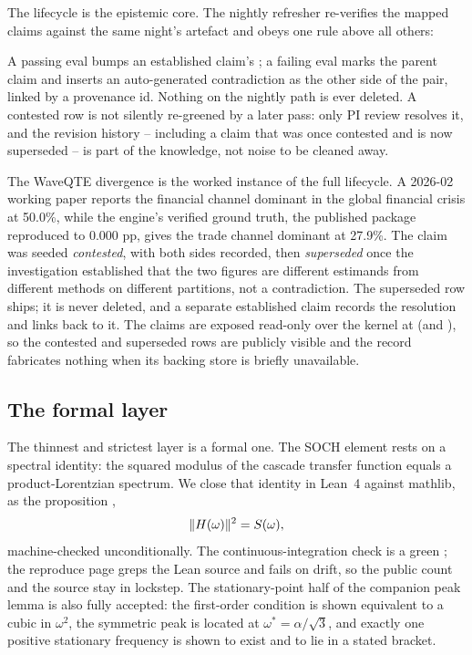 The lifecycle is the epistemic core. The nightly refresher
 re-verifies the mapped claims against the same
night's artefact and obeys one rule above all others:

\begin{invariant}
\label{inv:nodelete}
A passing eval bumps an established claim's ; a failing eval
marks the parent claim  and inserts an auto-generated
contradiction as the other side of the pair, linked by a  provenance
id. Nothing on the nightly path is ever deleted. A contested row is not silently
re-greened by a later pass: only PI review resolves it, and the revision history
-- including a claim that was once contested and is now superseded -- is part of
the knowledge, not noise to be cleaned away.
\end{invariant}

\noindent The WaveQTE divergence is the worked instance of the full lifecycle. A
2026-02 working paper reports the financial channel dominant in the global
financial crisis at 50.0\%, while the engine's verified ground truth, the
published package reproduced to 0.000 pp, gives the trade channel dominant at
27.9\%. The claim was seeded \emph{contested}, with both sides recorded, then
\emph{superseded} once the investigation established that the two figures are
different estimands from different methods on different partitions, not a
contradiction. The superseded row ships; it is never deleted, and a separate
established claim records the resolution and links back to it. The claims are
exposed read-only over the kernel at  (and
), so the contested and superseded rows are publicly
visible and the record fabricates nothing when its backing store is briefly
unavailable.

\subsection{The formal layer}
\label{sec:verification-formal}

The thinnest and strictest layer is a formal one. The SOCH element rests on a
spectral identity: the squared modulus of the cascade transfer function equals a
product-Lorentzian spectrum. We close that identity in Lean~4 against mathlib, as
the proposition ,
\[
  \lVert H(\omega) \rVert^{2} = S(\omega),
\]
machine-checked unconditionally. The continuous-integration check is a green
; the reproduce page greps the Lean source and fails on drift, so
the public count and the source stay in lockstep. The stationary-point half of the
companion peak lemma is also fully accepted: the first-order condition is shown
equivalent to a cubic in $\omega^{2}$, the symmetric peak is located at
$\omega^{\ast} = \alpha/\sqrt{3}$, and exactly one positive stationary frequency
is shown to exist and to lie in a stated bracket.

